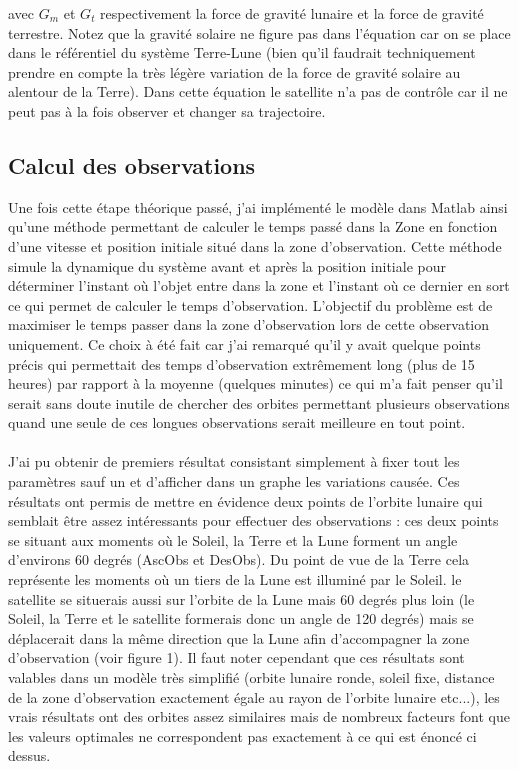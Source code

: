 \documentclass[12pt]{article} %
\begin{document}
		avec $G_m$ et $G_t$ respectivement la force de gravité lunaire et la force de gravité terrestre. Notez que la gravité solaire ne figure pas dans l'équation car on se place dans le référentiel du système Terre-Lune (bien qu'il faudrait techniquement prendre en compte la très légère variation de la force de gravité solaire au alentour de la Terre). Dans cette équation le satellite n'a pas de contrôle car il ne peut pas à la fois observer et changer sa trajectoire.
		
		\subsection{Calcul des observations}
		Une fois cette étape théorique passé, j'ai implémenté le modèle dans Matlab ainsi qu'une méthode permettant de calculer le temps passé dans la \gls{Zone} en fonction d'une vitesse et position initiale situé dans la zone d'observation. Cette méthode simule la dynamique du système avant et après la position initiale pour déterminer l'instant où l'objet entre dans la zone et l'instant où ce dernier en sort ce qui permet de calculer le temps d'observation. L'objectif du problème est de maximiser le temps passer dans la zone d'observation lors de cette observation uniquement. Ce choix à été fait car j'ai remarqué qu'il y avait quelque points précis qui permettait des temps d'observation extrêmement long (plus de 15 heures) par rapport à la moyenne (quelques minutes) ce qui m'a fait penser qu'il serait sans doute inutile de chercher des orbites permettant plusieurs observations quand une seule de ces longues observations serait meilleure en tout point.
		\\ \\
		J'ai pu obtenir de premiers résultat consistant simplement à fixer tout les paramètres sauf un et d'afficher dans un graphe les variations causée. Ces résultats ont permis de mettre en évidence deux points de l'orbite lunaire qui semblait être assez intéressants pour effectuer des observations : ces deux points se situant aux moments où le Soleil, la Terre et la Lune forment un angle d'environs 60 degrés (\gls{AscObs} et \gls{DesObs}). Du point de vue de la Terre cela représente les moments où un tiers de la Lune est illuminé par le Soleil. le satellite se situerais aussi sur l'orbite de la Lune mais 60 degrés plus loin (le Soleil, la Terre et le satellite formerais donc un angle de 120 degrés) mais se déplacerait dans la même direction que la Lune afin d'accompagner la zone d'observation (voir figure 1). Il faut noter cependant que ces résultats sont valables dans un modèle très simplifié (orbite lunaire ronde, soleil fixe, distance de la zone d'observation exactement égale au rayon de l'orbite lunaire etc...), les vrais résultats ont des orbites assez similaires mais de nombreux facteurs font que les valeurs optimales ne correspondent pas exactement à ce qui est énoncé ci dessus.
		
\end{document}
